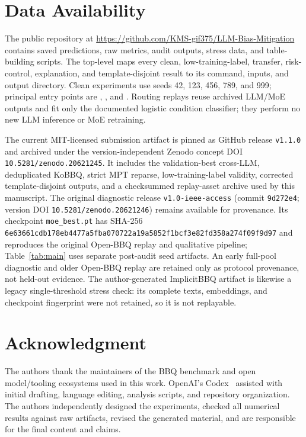 \documentclass{ieeeaccess}
\begin{document}
\section*{Data Availability}
\begingroup\raggedright
The public repository at \url{https://github.com/KMS-gif375/LLM-Bias-Mitigation} contains saved predictions, raw metrics, audit outputs, stress data, and table-building scripts. The top-level  maps every clean, low-training-label, transfer, risk-control, explanation, and template-disjoint result to its command, inputs, and output directory. Clean experiments use seeds 42, 123, 456, 789, and 999; principal entry points are , , and . Routing replays reuse archived LLM/MoE outputs and fit only the documented logistic condition classifier; they perform no new LLM inference or MoE retraining.

The current MIT-licensed submission artifact is pinned as GitHub release \texttt{v1.1.0} and archived under the version-independent Zenodo concept DOI \texttt{10.5281/zenodo.20621245}. It includes the validation-best cross-LLM, deduplicated KoBBQ, strict MPT reparse, low-training-label validity, corrected template-disjoint outputs, and a checksummed replay-asset archive used by this manuscript. The original diagnostic release \texttt{v1.0-ieee-access} (commit \texttt{9d272e4}; version DOI \texttt{10.5281/zenodo.20621246}) remains available for provenance. Its checkpoint \texttt{moe\_best.pt} has SHA-256 \mbox{\texttt{6e63661cdb178eb44}}\allowbreak\mbox{\texttt{77a5fba070722a19}}\allowbreak\mbox{\texttt{a5852f1bcf3e82fd}}\allowbreak\mbox{\texttt{358a274f09f9d97}} and reproduces the original Open-BBQ replay and qualitative pipeline; Table~\ref{tab:main} uses separate post-audit seed artifacts. An early full-pool diagnostic and older Open-BBQ replay are retained only as protocol provenance, not held-out evidence. The author-generated ImplicitBBQ artifact is likewise a legacy single-threshold stress check: its complete texts, embeddings, and checkpoint fingerprint were not retained, so it is not replayable.
\par\endgroup

\section*{Acknowledgment}
The authors thank the maintainers of the BBQ benchmark and open model/tooling ecosystems used in this work. OpenAI's Codex~\cite{openai2026codex} assisted with initial drafting, language editing, analysis scripts, and repository organization. The authors independently designed the experiments, checked all numerical results against raw artifacts, revised the generated material, and are responsible for the final content and claims.
\end{document}
